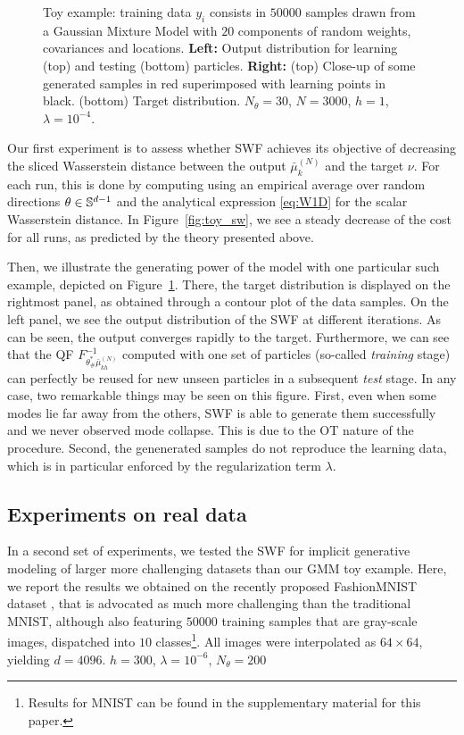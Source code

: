 \begin{figure}
\begin{centering}
\begin{tabular}{ccc|c}
\end{tabular}
\par\end{centering}
\caption{Toy example: training data $y_i$ consists in $50 000$ samples drawn from a Gaussian Mixture Model with $20$ components of random weights, covariances and locations. \textbf{Left:} Output distribution for learning (top) and testing (bottom) particles. \textbf{Right:} (top) Close-up of some generated samples in red superimposed with learning points in black. (bottom) Target distribution. $N_\theta=30$, $N=3000$, $h=1$, $\lambda=10^{-4}$.\label{fig:toy_example}}
\end{figure}

Our first experiment is to assess whether SWF achieves its objective of decreasing the sliced Wasserstein distance between the output $\bar{\mu}_{k}^{(N)}$ and the target $\nu$. For each run, this is done by computing \label{eqn:sw} using an empirical average over random directions $\theta\in\mathbb{S}^{d-1}$ and the analytical expression \eqref{eq:W1D} for the scalar Wasserstein distance. In Figure~\ref{fig:toy_sw}, we see a steady decrease of the cost for all runs, as predicted by the theory presented above.

Then, we illustrate the generating power of the model with one particular such example, depicted on Figure~\ref{fig:toy_example}. There, the target distribution is displayed on the rightmost panel, as obtained through a contour plot of the data samples. On the left panel, we see the output distribution of the SWF at different iterations. As can be seen, the output converges rapidly to the target. Furthermore, we can see that the QF $F^{-1}_{\theta^*_\#\bar{\mu}_{kh}^{(N)}}$ computed with one set of particles (so-called \textit{training} stage) can perfectly be reused for new unseen particles in a subsequent \textit{test} stage. In any case, two remarkable things may be seen on this figure. First, even when some modes lie far away from the others, SWF is able to generate them successfully and we never observed mode collapse. This is due to the OT nature of the procedure. Second, the genenerated samples do not reproduce the learning data, which is in particular enforced by the regularization term $\lambda$.

\subsection{Experiments on real data}
\label{sub:real_data}

In a second set of experiments, we tested the SWF for implicit generative modeling of larger more challenging datasets than our GMM toy example. Here, we report the results we obtained on the recently proposed FashionMNIST dataset \cite{xiao2017fashion}, that is advocated as much more challenging than the traditional MNIST, although also featuring $50000$ training samples that are gray-scale images, dispatched into $10$ classes\footnote{Results for MNIST can be found in the supplementary material for this paper.}. All images were interpolated as $64\times 64$, yielding $d=4096$. $h=300$, $\lambda=10^{-6}$, $N_\theta=200$

